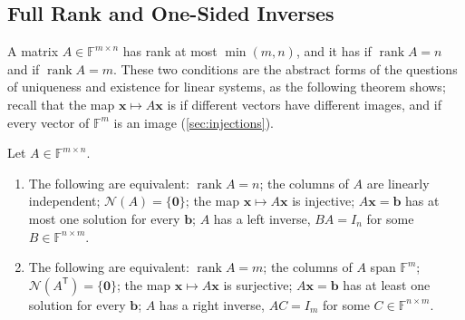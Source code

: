 \subsection{Full Rank and One-Sided Inverses}

A matrix $A\in\mathbb F^{m\times n}$ has rank at most $\min(m,n)$, and it has  if $\operatorname{rank}A=n$ and  if $\operatorname{rank}A=m$. These two conditions are the abstract forms of the questions of uniqueness and existence for linear systems, as the following theorem shows; recall that the map $\mathbf x\mapsto A\mathbf x$ is  if different vectors have different images, and  if every vector of $\mathbb F^m$ is an image (\cref{sec:injections}).

\begin{theorem}
\label{thm:full-rank}
Let $A\in\mathbb F^{m\times n}$.
\begin{enumerate}
\item The following are equivalent: $\operatorname{rank}A=n$; the columns of $A$ are linearly independent; $\mathcal N(A)=\{\mathbf 0\}$; the map $\mathbf x\mapsto A\mathbf x$ is injective; $A\mathbf x=\mathbf b$ has at most one solution for every $\mathbf b$; $A$ has a left inverse, $BA=I_n$ for some $B\in\mathbb F^{n\times m}$.
\item The following are equivalent: $\operatorname{rank}A=m$; the columns of $A$ span $\mathbb F^m$; $\mathcal N(A^{\mathsf T})=\{\mathbf 0\}$; the map $\mathbf x\mapsto A\mathbf x$ is surjective; $A\mathbf x=\mathbf b$ has at least one solution for every $\mathbf b$; $A$ has a right inverse, $AC=I_m$ for some $C\in\mathbb F^{n\times m}$.
\end{enumerate}
\end{theorem}

